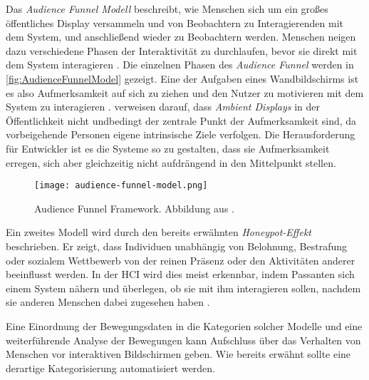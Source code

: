 Das \emph{Audience Funnel Modell} beschreibt, wie Menschen sich um ein großes öffentliches Display versammeln
und von Beobachtern zu Interagierenden mit dem System, und anschließend wieder zu Beobachtern werden.
Menschen neigen dazu verschiedene Phasen der Interaktivität zu durchlaufen,
bevor sie direkt mit dem System interagieren \citep{wouters_uncovering_2016, mai_audience_2018}.
Die einzelnen Phasen des \emph{Audience Funnel} werden in \autoref{fig:AudienceFunnelModel} gezeigt.
Eine der Aufgaben eines Wandbildschirms ist es also Aufmerksamkeit auf sich zu ziehen
und den Nutzer zu motivieren mit dem System zu interagieren \citep{mai_audience_2018}.
\citet{mai_audience_2018} verweisen darauf, dass \emph{Ambient Displays} in der Öffentlichkeit
nicht undbedingt der zentrale Punkt der Aufmerksamkeit sind, da vorbeigehende Personen eigene intrinsische Ziele verfolgen.
Die Herausforderung für Entwickler ist es die Systeme so zu gestalten,
dass sie Aufmerksamkeit erregen, sich aber gleichzeitig nicht aufdrängend in den Mittelpunkt stellen.
\begin{figure}[ht]
    \begin{center}
    \texttt{[image: audience-funnel-model.png]}
    \end{center}
    \caption{Audience Funnel Framework. Abbildung aus \citet{mai_audience_2018}.}
    \label{fig:AudienceFunnelModel}
  \end{figure}
Ein zweites Modell wird durch den bereits erwähnten \emph{Honeypot-Effekt} beschrieben.
Er zeigt, dass Individuen unabhängig von Belohnung, Bestrafung oder sozialem Wettbewerb
von der reinen Präsenz oder den Aktivitäten anderer beeinflusst werden.
In der \ac{HCI} wird dies meist erkennbar, indem Passanten sich einem System nähern
und überlegen, ob sie mit ihm interagieren sollen,
nachdem sie anderen Menschen dabei zugesehen haben \citep{wouters_uncovering_2016}.

Eine Einordnung der Bewegungsdaten in die Kategorien solcher Modelle
und eine weiterführende Analyse der Bewegungen kann Aufschluss über das Verhalten von Menschen
vor interaktiven Bildschirmen geben.
Wie bereits erwähnt sollte eine derartige Kategorisierung automatisiert werden.

